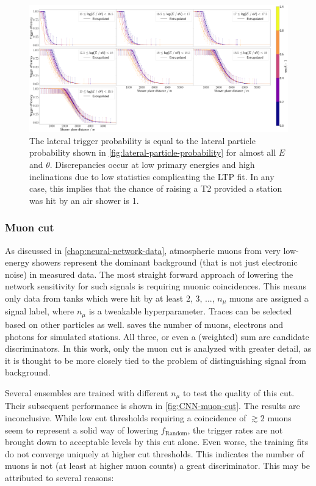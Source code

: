 \begin{figure}
	\centering
	\includegraphics[width=1\textwidth]{./plots/ideal_classifier_LTP.png}
	\caption{The lateral trigger probability is equal to the lateral particle probability shown in \autoref{fig:lateral-particle-probability} for almost all 
	$E$ and $\theta$. Discrepancies occur at low primary energies and high inclinations due to low statistics complicating the LTP fit. In any case, this implies 
	that the chance of raising a T2 provided a station was hit by an air shower is 1.}
	\label{fig:NN-LPP}
\end{figure}

\subsubsection{Muon cut}

As discussed in \autoref{chap:neural-network-data}, atmospheric muons from very low-energy showers represent the dominant background (that is not just electronic 
noise) in measured data. The most straight forward approach of lowering the network sensitivity for such signals is requiring muonic coincidences. This means only 
data from tanks which were hit by at least 2, 3, ..., $n_\mu$ muons are assigned a signal label, where $n_\mu$ is a tweakable hyperparameter. Traces can be 
selected based on other particles as well. \Offline saves the number of muons, electrons and photons for simulated stations. All three, or even a (weighted) sum
are candidate discriminators. In this work, only the muon cut is analyzed with greater detail, as it is thought to be more closely tied to the problem of 
distinguishing signal from background.

Several ensembles are trained with different $n_\mu$ to test the quality of this cut. Their subsequent performance is shown in \autoref{fig:CNN-muon-cut}. The 
results are inconclusive. While low cut thresholds requiring a coincidence of $\gtrsim 2$ muons seem to represent a solid way of lowering $f_\text{Random}$, the 
trigger rates are not brought down to acceptable levels by this cut alone. Even worse, the training fits do not converge uniquely at higher cut thresholds.
This indicates the number of muons is not (at least at higher muon counts) a great discriminator. This may be attributed to several reasons:


